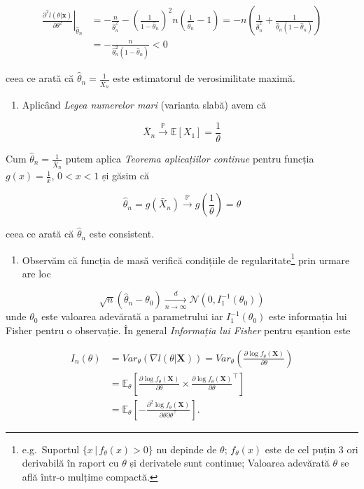 \documentclass[]{article}
\providecommand{\tightlist}{%
  \setlength{\itemsep}{0pt}\setlength{\parskip}{0pt}}
\let\rmarkdownfootnote\footnote%
\def\footnote{\protect\rmarkdownfootnote}
\begin{document}
\begin{align*}
  \left. \frac{\partial^2 l(\theta|\mathbf{x})}{\partial\theta^2}\right\vert_{\hat{\theta}_n} &= -\frac{n}{\hat{\theta}_n^2} - \left(\frac{1}{1-\hat{\theta}_n}\right)^2n\left(\frac{1}{\hat{\theta}_n} - 1\right) = -n\left(\frac{1}{\hat{\theta}_n^2} + \frac{1}{\hat{\theta}_n(1-\hat{\theta}_n)}\right)\\
    & = -\frac{n}{\hat{\theta}_n^2(1-\hat{\theta}_n)}<0
\end{align*}

ceea ce arată că \(\hat{\theta}_n = \frac{1}{\bar{X}_n}\) este
estimatorul de verosimilitate maximă.

\begin{enumerate}
\def\labelenumi{\alph{enumi})}
\setcounter{enumi}{2}
\tightlist
\item
  Aplicând \emph{Legea numerelor mari} (varianta slabă) avem că
\end{enumerate}

\[
  \bar{X}_n \overset{\mathbb{P}}{\to} \mathbb{E}[X_1] = \frac{1}{\theta}
\]

Cum \(\hat{\theta}_n = \frac{1}{\bar{X}_n}\) putem aplica \emph{Teorema
aplicațiilor continue} pentru funcția \(g(x) = \frac{1}{x}\), \(0<x<1\)
și găsim că

\[
  \hat{\theta}_n = g(\bar{X}_n) \overset{\mathbb{P}}{\to} g\left(\frac{1}{\theta}\right) = \theta
\]

ceea ce arată că \(\hat{\theta}_n\) este consistent.

\begin{enumerate}
\def\labelenumi{\alph{enumi})}
\setcounter{enumi}{3}
\tightlist
\item
  Observăm că funcția de masă verifică condițiile de
  regularitate\footnote{e.g.~Suportul \(\{x\,|\,f_{\theta}(x)>0\}\) nu
    depinde de \(\theta\); \(f_{\theta}(x)\) este de cel puțin 3 ori
    derivabilă în raport cu \(\theta\) și derivatele sunt continue;
    Valoarea adevărată \(\theta\) se află într-o mulțime compactă.} prin
  urmare are loc
\end{enumerate}

\[
  \sqrt{n}\left(\hat{\theta}_n - \theta_0\right) \underset{n\to\infty}{\overset{d}{\longrightarrow}} \mathcal{N}(0,I_1^{-1}(\theta_0))
\] unde \(\theta_0\) este valoarea adevărată a parametrului iar
\(I_1^{-1}(\theta_0)\) este informația lui Fisher pentru o observație.
În general \emph{Informația lui Fisher} pentru eșantion este

\begin{align*}
  I_n(\theta) &= Var_{\theta}\left(\nabla l(\theta|\mathbf{X})\right) = Var_{\theta}\left(\frac{\partial \log f_{\theta}(\mathbf{X})}{\partial\theta}\right)\\
        &= \mathbb{E}_{\theta}\left[\frac{\partial \log f_{\theta}(\mathbf{X})}{\partial\theta} \times \frac{\partial \log f_{\theta}(\mathbf{X})}{\partial\theta}^\intercal\right]\\
        &= \mathbb{E}_{\theta}\left[-\frac{\partial^2 \log f_{\theta}(\mathbf{X})}{\partial\theta\partial\theta^\intercal}\right].
\end{align*}
\end{document}
